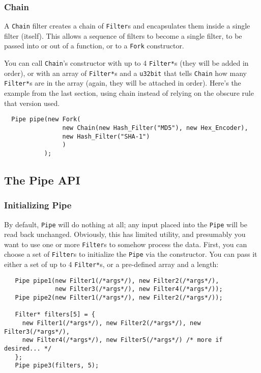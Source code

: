 \documentclass{article}
\newcommand{\type}[1]{\texttt{#1}}
\begin{document}
\subsubsection{Chain}

A \type{Chain} filter creates a chain of \type{Filter}s and
encapsulates them inside a single filter (itself). This allows a
sequence of filters to become a single filter, to be passed into or
out of a function, or to a \type{Fork} constructor.

You can call \type{Chain}'s constructor with up to 4 \type{Filter*}s
(they will be added in order), or with an array of \type{Filter*}s and
a \type{u32bit} that tells \type{Chain} how many \type{Filter*}s are
in the array (again, they will be attached in order). Here's the
example from the last section, using chain instead of relying on the
obscure rule that version used.

\begin{verbatim}
  Pipe pipe(new Fork(
                new Chain(new Hash_Filter("MD5"), new Hex_Encoder),
                new Hash_Filter("SHA-1")
                )
           );
\end{verbatim}

\subsection{The Pipe API}

\subsubsection{Initializing Pipe}

By default, \type{Pipe} will do nothing at all; any input placed into
the \type{Pipe} will be read back unchanged. Obviously, this has
limited utility, and presumably you want to use one or more
\type{Filter}s to somehow process the data. First, you can choose a
set of \type{Filter}s to initialize the \type{Pipe} via the
constructor. You can pass it either a set of up to 4 \type{Filter*}s,
or a pre-defined array and a length:

\begin{verbatim}
   Pipe pipe1(new Filter1(/*args*/), new Filter2(/*args*/),
              new Filter3(/*args*/), new Filter4(/*args*/));
   Pipe pipe2(new Filter1(/*args*/), new Filter2(/*args*/));

   Filter* filters[5] = {
     new Filter1(/*args*/), new Filter2(/*args*/), new Filter3(/*args*/),
     new Filter4(/*args*/), new Filter5(/*args*/) /* more if desired... */
   };
   Pipe pipe3(filters, 5);
\end{verbatim}
\end{document}
